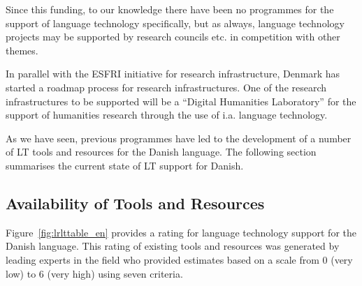 \begin{multicols}{2}
Since this funding, to our knowledge there have been no programmes for the support of language technology specifically, but as always, language technology projects may be supported by research councils etc. in competition with other themes.

In parallel with the ESFRI initiative for research infrastructure, Denmark has started a roadmap process for research infrastructures. One of the research infrastructures to be supported will be a “Digital Humanities Laboratory” for the support of humanities research through the use of i.a. language technology.


As we have seen, previous programmes have led to the development of a number of LT tools and resources for the Danish language. The following section summarises the current state of LT support for Danish.
  
\subsection{Availability of Tools and Resources}

Figure~\ref{fig:lrlttable_en} provides a rating for language technology support for the Danish language. This rating of existing tools and resources was generated by leading experts in the field who provided estimates based on a scale from 0 (very low) to 6 (very high) using seven criteria.


\end{multicols}
